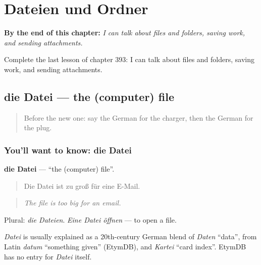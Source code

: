 
\chapter{Dateien und Ordner}
\label{ch:ge-dateien-und-ordner}

\begin{chapteropening}
\textbf{By the end of this chapter:} \emph{I can talk about files and folders, saving work, and sending attachments.}

Complete the last lesson of chapter 393: I can talk about files and folders, saving work, and sending attachments.
\end{chapteropening}

\section[die Datei]{die Datei — the (computer) file}

\label{lesson:GE-C393-datei}



\begin{quote}
Before the new one: say the German for the charger, then the German for the plug.
\end{quote}

\subsection*{You'll want to know: die Datei}
\textbf{die Datei} — \textquotedblleft{}the (computer) file\textquotedblright{}.

\begin{quote}
Die Datei ist zu groß für eine E-Mail.
\end{quote}

\begin{quote}
\emph{The file is too big for an email.}
\end{quote}

Plural: \emph{die Dateien}. \emph{Eine Datei öffnen} — to open a file.

\begin{cousinweb}
\emph{Datei} is usually explained as a 20th-century German blend of \emph{Daten} \textquotedblleft{}data\textquotedblright{}, from Latin \emph{datum} \textquotedblleft{}something given\textquotedblright{} (EtymDB), and \emph{Kartei} \textquotedblleft{}card index\textquotedblright{}. EtymDB has no entry for \emph{Datei} itself.
\end{cousinweb}

